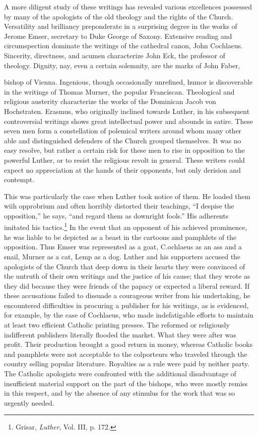 A more diligent study of these writings has revealed various excellences
possessed by many of the apologists of the old theology and
the rights of the Church. Versatility and brilliancy preponderate in
a surprising degree in the works of Jerome Emser, secretary to Duke
George of Saxony. Extensive reading and circumspection dominate
the writings of the cathedral canon, John Cochlaeus. Sincerity, directness, and acumen characterize John Eck, the professor of theology.
Dignity, nay, even a certain solemnity, are the marks of John Faber,

bishop of Vienna. Ingenious, though occasionally unrefined, humor is
discoverable in the writings of Thomas Murner, the popular Franciscan. Theological and religious austerity characterize the works of
the Dominican Jacob von Hochstraten. Erasmus, who originally
inclined towards Luther, in his subsequent controversial writings
shows great intellectual power and abounds in satire. These seven men
form a constellation of polemical writers around whom many other
able and distinguished defenders of the Church grouped themselves.
It was no easy resolve, but rather a certain risk for these men to
rise in opposition to the powerful Luther, or to resist the religious
revolt in general. These writers could expect no appreciation at the
hands of their opponents, but only derision and contempt.

This was particularly the case when Luther took notice of them. He
loaded them wiih opprobrium and often horribly distorted their teachings,
“I despise the opposition,” he says, “and regard them as downright fools.”
His adherents imitated his tactics.\footnote{Grisar, \textit{Luther}, Vol. III, p. 172.}
In the event that an opponent of his
achieved prominence, he was liable to be depicted as a beast in the cartoons
and pamphlets of the opposition. Thus Emser was represented as a goat,
C.ochlaeus as an ass and a snail, Murner as a cat, Lemp as a dog. Luther and
his supporters accused the apologists of the Church that deep down in their
hearts they were convinced of the untruth of their own writings and the
justice of his cause; that they wrote as they did because they were friends of
the papacy or expected a liberal reward. If these accusations failed to dissuade
a courageous writer from his undertaking, he encountered difficulties in
procuring a publisher for his writings, as is evidenced, for example, by the case
of Cochlaeus, who made indefatigable efforts to maintain at least two efficient
Catholic printing presses. The reformed or religiously indifferent publishers
literally flooded the market. What they were after was profit. Their production
brought a good return in money, whereas Catholic books and pamphlets
were not acceptable to the colporteurs who traveled through the country
selling popular literature. Royalties as a rule were paid by neither party. The
Catholic apologists were confronted with the additional disadvantage of insufficient
material support on the part of the bishops, who were mostly remiss in
this respect, and by the absence of any stimulus for the work that
was so urgently needed.

